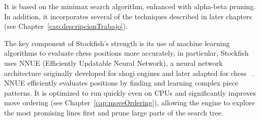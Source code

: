 \vspace{1em}

\par It is based on the minimax search algorithm, enhanced with alpha-beta pruning. In addition, it incorporates several of the techniques described in later chapters (see Chapter~\ref{cap:descripcionTrabajo}).

\vspace{1em}

\par The key component of Stockfish's strength is its use of machine learning algorithms to evaluate chess positions more accurately, in particular, Stockfish uses NNUE (Efficiently Updatable Neural Network), a neural network architecture originally developed for shogi engines and later adapted for chess ~\cite{NNUE}. NNUE efficiently evaluates positions by finding and learning complex piece patterns. It is optimized to run quickly even on CPUs and significantly improves move ordering (see Chapter~\ref{cap:moveOrdering}), allowing the engine to explore the most promising lines first and prune large parts of the search tree.

